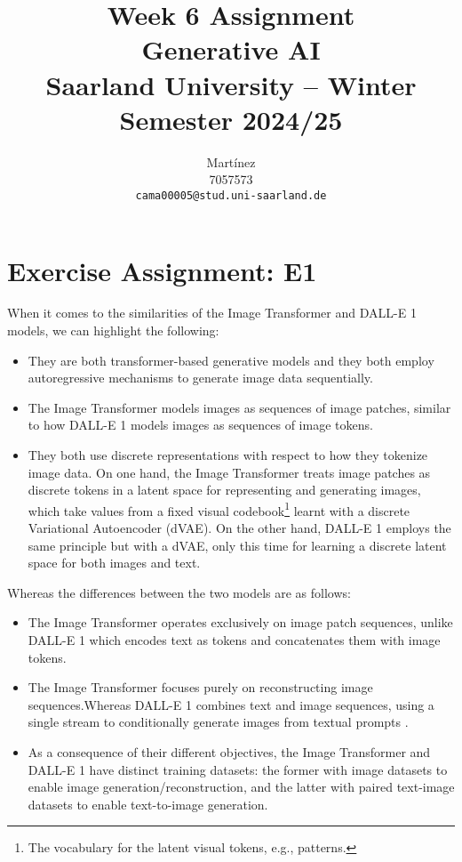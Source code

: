 \documentclass{article}
\title{Week 6 Assignment\\
\vspace{2mm}
\small{Generative AI}
\\
\vspace{2mm}
\small{Saarland University -- Winter Semester 2024/25}
}
\author{%
  Martínez \\
  7057573 \\
  \texttt{cama00005@stud.uni-saarland.de} \\
}
\begin{document}
\DeclareRobustCommand{\textitbf}[1]{\textbf{\textit{#1}}} %

\maketitle

\section{Exercise Assignment: E1}\label{sec:e1}

When it comes to the similarities of the Image Transformer \cite{parmar2018imagetransformer} and DALL-E 1 \cite{dalle-1-2021} models, we can highlight the following: 
\begin{itemize}
    \item They are both transformer-based generative models and they both employ autoregressive mechanisms to generate image data sequentially.
    \item The Image Transformer models images as sequences of image patches, similar to how DALL-E 1 models images as sequences of image tokens.
    \item They both use discrete representations with respect to how they tokenize image data. On one hand, the Image Transformer treats image patches as discrete tokens in a latent space for representing and generating images, which take values from a fixed visual codebook\footnote{The vocabulary for the latent visual tokens, e.g., patterns.} learnt with a discrete Variational Autoencoder (dVAE). On the other hand, DALL-E 1 employs the same principle but with a dVAE, only this time for learning a discrete latent space for both images and text.
\end{itemize}

Whereas the differences between the two models are as follows:

\begin{itemize}
    \item The Image Transformer operates exclusively on image patch sequences, unlike DALL-E 1 which encodes text as tokens and concatenates them with image tokens.
    \item The Image Transformer focuses purely on reconstructing image sequences.Whereas DALL-E 1 combines text and image sequences, using a single stream to conditionally generate images from textual prompts .
    \item As a consequence of their different objectives, the Image Transformer and DALL-E 1 have distinct training datasets: the former with image datasets
    to enable image generation/reconstruction, and the latter with paired text-image datasets to enable text-to-image generation.
\end{itemize}
\end{document}
